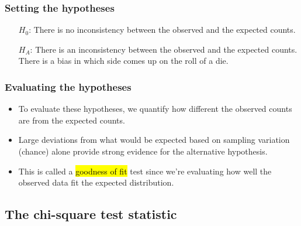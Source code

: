 \begin{frame}
\frametitle{Setting the hypotheses}


\pause

\begin{itemize}
\item[$H_0$:] There is no inconsistency between the observed and the expected counts. 

\pause

\item[$H_A$:] There is an inconsistency between the observed and the expected counts.  There is a bias in which side comes up on the roll of a die.
\end{itemize}

\end{frame}


\begin{frame}
\frametitle{Evaluating the hypotheses}

\begin{itemize}

\item To evaluate these hypotheses, we quantify how different the observed counts are from the expected counts. 

\pause

\item Large deviations from what would be expected based on sampling variation (chance) alone provide strong evidence for the alternative hypothesis.

\pause

\item This is called a \hl{goodness of fit} test since we're evaluating how well the observed data fit the expected distribution.

\end{itemize}

\end{frame}


\subsection{The chi-square test statistic}

